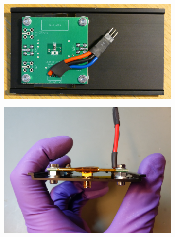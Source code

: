 \documentclass[a4paper]{article}
\begin{document}
\begin{appendices}
\begin{figure}[ht!]
\centering
\begin{subfigure}[t]{0.48\textwidth}
\includegraphics[width=\textwidth]{fig/P1170915-cropped.jpg}
\end{subfigure}
%
\begin{subfigure}[t]{0.48\textwidth}
\includegraphics[width=\textwidth]{fig/IMG_20201201_121845.jpg}
\end{subfigure}


\end{figure}
\end{appendices}
\end{document}
